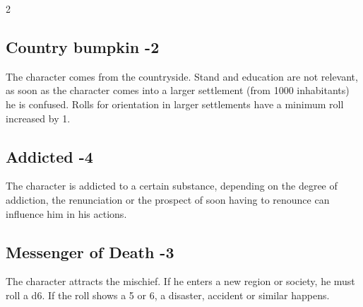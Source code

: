 \begin{multicols}{2}
\begin{tcolorbox}

\end{tcolorbox}

\begin{tcolorbox}
    \subsection*{Country bumpkin \hfill \small{-2 }}
    \tcblower
The character comes from the countryside. Stand and education are not relevant, as soon as the character comes into a larger settlement (from 1000 inhabitants) he is confused. Rolls for orientation in larger settlements have a minimum roll increased by 1.


\vspace{3mm}



\end{tcolorbox}

\begin{tcolorbox}
    \subsection*{Addicted \hfill \small{-4 }}
    \tcblower
The character is addicted to a certain substance, depending on the degree of addiction, the renunciation or the prospect of soon having to renounce can influence him in his actions.


\vspace{3mm}



\end{tcolorbox}

\begin{tcolorbox}
    \subsection*{Messenger of Death \hfill \small{-3 }}
    \tcblower
The character attracts the mischief. If he enters a new region or society, he must roll a d6. If the roll shows a 5 or 6, a disaster, accident or similar happens.



\end{tcolorbox}
\end{multicols}
